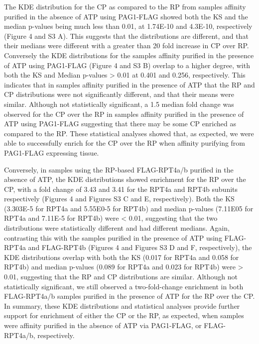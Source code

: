 	The KDE distribution for the CP as compared to the RP from samples affinity purified in the absence of ATP using PAG1-FLAG showed both the KS and the median p-values being much less than 0.01, at 1.74E-10 and 4.3E-10, respectively (Figure 4 and S3 A). This suggests that the distributions are different, and that their medians were different with a greater than 20 fold increase in CP over RP. Conversely the KDE distributions for the samples affinity purified in the presence of ATP using PAG1-FLAG (Figure 4 and S3 B) overlap to a higher degree, with both the KS and Median p-values > 0.01 at 0.401 and 0.256, respectively. This indicates that in samples affinity purified in the presence of ATP that the RP and CP distributions were not significantly different, and that their means were similar. Although not statistically significant, a 1.5 median fold change was observed for the CP over the RP in samples affinity purified in the presence of ATP using PAG1-FLAG suggesting that there may be some CP enriched as compared to the RP. These statistical analyses showed that, as expected, we were able to successfully enrich for the CP over the RP when affinity purifying from PAG1-FLAG expressing tissue.

	Conversely, in samples using the RP-based FLAG-RPT4a/b purified in the absence of ATP, the KDE distributions showed enrichment for the RP over the CP, with a fold change of 3.43 and 3.41 for the RPT4a and RPT4b subunits respectively (Figures 4 and Figures S3 C and E, respectively). Both the KS (3.303E-5 for RPT4a and 5.55E0-5 for RPT4b) and median p-values (7.11E05 for RPT4a and 7.11E-5 for RPT4b) were < 0.01, suggesting that the two distributions were statistically different and had different medians. Again, contrasting this with the samples purified in the presence of ATP using FLAG-RPT4a and FLAG-RPT4b (Figures 4 and Figures S3 D and F, respectively), the KDE distributions overlap with both the KS (0.017 for RPT4a and 0.058 for RPT4b) and median p-values (0.089 for RPT4a and 0.023 for RPT4b) were > 0.01, suggesting that the RP and CP distributions are similar. Although not statistically significant, we still observed a two-fold-change enrichment in both FLAG-RPT4a/b samples purified in the presence of ATP for the RP over the CP. In summary, these KDE distributions and statistical analyses provide further support for enrichment of either the CP or the RP, as expected, when samples were affinity purified in the absence of ATP via PAG1-FLAG, or FLAG-RPT4a/b, respectively.

